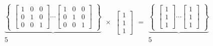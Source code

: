\begin{footnotesize}
$$
\begin{smallmatrix}  \underbrace{
    \left\{
        \begin{smallmatrix}
            \left[
            \begin{array}{cccc}
             1& 0 &0 \\
             0& 1 &0 \\
             0& 0 &1
            \end{array}
            \right ]
            \cdots
            \left[
            \begin{array}{cccc}
                1& 0 &0 \\
                0& 1 &0 \\
                0& 0 &1
            \end{array}
            \right]
        \end{smallmatrix}
        \right\}
     }\\5
\end{smallmatrix}
\times
\begin{smallmatrix}
\left[
    \begin{array}{cccc}
    1\\
    1\\
    1
    \end{array}
\right ]
\end{smallmatrix}
=
\begin{smallmatrix}  \underbrace{
    \left\{
        \begin{smallmatrix}
            \left[
            \begin{array}{cccc}
             1 \\
             1 \\
             1
            \end{array}
            \right ]
            \cdots
            \left[
            \begin{array}{cccc}
                1 \\
                1 \\
                1
            \end{array}
            \right]
        \end{smallmatrix}
        \right\}
     }\\5
\end{smallmatrix}
$$
\end{footnotesize}

